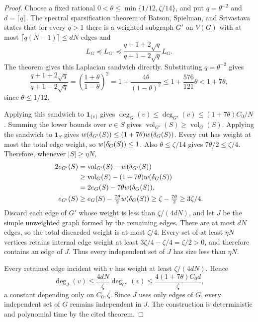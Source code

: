 \begin{proof}
Choose a fixed rational $0<\theta\le\min\{1/12,\zeta/14\}$,
and put $q=\theta^{-2}$ and $d=\lceil q\rceil$. The spectral
sparsification theorem of Batson, Spielman, and
Srivastava~\cite[Theorem~1.1]{BSS2012} states that for every $q>1$ there is a
weighted subgraph $G'$ on $V(G)$ with at most
$\lceil q(N-1)\rceil\le dN$ edges and
\[
 L_G\preceq L_{G'}\preceq
 \frac{q+1+2\sqrt q}{q+1-2\sqrt q}L_G.
\]
The theorem gives this Laplacian sandwich directly. Substituting $q=\theta^{-2}$ gives
\[
 \frac{q+1+2\sqrt q}{q+1-2\sqrt q}
 =\left(\frac{1+\theta}{1-\theta}\right)^2
 =1+\frac{4\theta}{(1-\theta)^2}
 \le1+\frac{576}{121}\theta<1+7\theta,
\]
since $\theta\le1/12$.

Applying this sandwich to $\mathbf1_{\{v\}}$ gives
$\deg_G(v)\le\deg_{G'}(v)\le(1+7\theta)C_0/N$. Summing the lower
bounds over $v\in S$ gives
$\operatorname{vol}_{G'}(S)\ge\operatorname{vol}_G(S)$.
Applying the sandwich to $\mathbf1_S$ gives
$w(\delta_{G'}(S))\le(1+7\theta)w(\delta_G(S))$. Every cut has weight at most the total edge weight, so
$w(\delta_G(S))\le1$. Also $\theta\le\zeta/14$ gives
$7\theta/2\le\zeta/4$. Therefore, whenever $|S|\ge\eta N$,
\begin{align*}
 2e_{G'}(S)&=\operatorname{vol}_{G'}(S)-w(\delta_{G'}(S))\\
 &\ge\operatorname{vol}_G(S)-(1+7\theta)w(\delta_G(S))\\
 &=2e_G(S)-7\theta w(\delta_G(S)),\\
 e_{G'}(S)&\ge e_G(S)-\tfrac{7\theta}{2}w(\delta_G(S))
 \ge\zeta-\tfrac{7\theta}{2}\ge3\zeta/4.
\end{align*}
Discard each edge of $G'$ whose weight is less than
$\zeta/(4dN)$, and let $J$ be the simple unweighted graph formed by
the remaining edges. There are at most $dN$ edges, so the total
discarded weight is at most $\zeta/4$. Every set of at least
$\eta N$ vertices retains internal edge weight at least
$3\zeta/4-\zeta/4=\zeta/2>0$, and therefore contains an edge of $J$.
Thus every independent set of $J$ has size less than $\eta N$.

Every retained edge incident with $v$ has weight at least
$\zeta/(4dN)$. Hence
\[
 \deg_J(v)\le\frac{4dN}{\zeta}\deg_{G'}(v)
 \le\frac{4(1+7\theta)C_0d}{\zeta},
\]
a constant depending only on $C_0,\zeta$. Since $J$ uses only
edges of $G$, every independent set of $G$ remains independent in
$J$. The construction is deterministic and polynomial time by the
cited theorem.
\end{proof}


